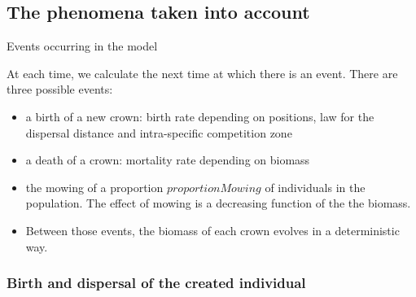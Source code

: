\documentclass{myBeamer}
\begin{document}
\subsection*{The phenomena taken into account}

\begin{frame}{Events occurring in the model}

At each time, we calculate the next time at which there is an event. There are three possible events: 
\bigskip 
\begin{itemize}
\item a birth of a new crown: birth rate depending on positions, law for the dispersal distance and intra-specific competition zone
\item a death of a crown: mortality rate depending on biomass
\item the mowing of a proportion $proportionMowing$ of individuals in the population. The effect of mowing is a decreasing function of the the biomass.

\bigskip 
\item Between those events, the biomass of each crown evolves in a deterministic way.
\end{itemize}
\end{frame}






\subsubsection{Birth and dispersal of the created individual}

%
%
\end{document}
